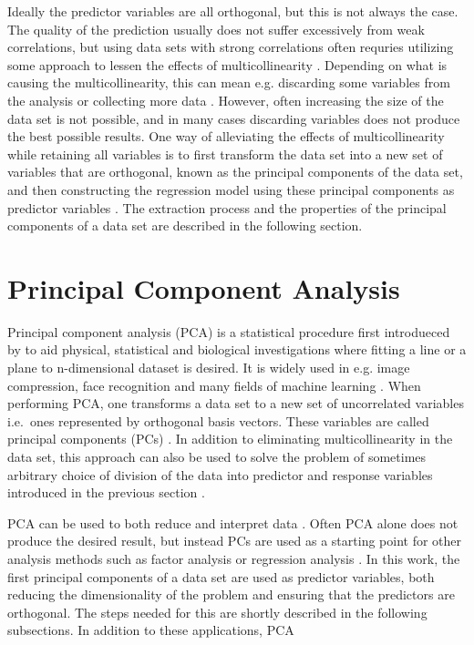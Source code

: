 \documentclass[english, twoside]{HYgradu}
\begin{document}
Ideally the predictor variables are all orthogonal, but this is not always the case. 
The quality of the prediction usually does not suffer excessively from weak correlations, but using data sets with strong correlations often requries utilizing some approach to lessen the effects of multicollinearity \citep{montgomery2012introduction}. Depending on what is causing the multicollinearity, this can mean e.g. discarding some variables from the analysis or collecting more data \citep{montgomery2012introduction}. However, often increasing the size of the data set is not possible, and in many cases discarding variables does not produce the best possible results. One way of alleviating the effects of multicollinearity while retaining all variables is to first transform the data set into a new set of variables that are orthogonal, known as the principal components of the data set, and then constructing the regression model using these principal components as predictor variables \citep{montgomery2012introduction}. The extraction process and the properties of the principal components of a data set are described in the following section.


\section{Principal Component Analysis} \label{sect:pca}
Principal component analysis (PCA) is a statistical procedure first introdueced by \citet{pearson1901lines} to aid physical, statistical and biological investigations where fitting a line or a plane to n-dimensional dataset is desired. It is widely used in e.g. image compression, face recognition and many fields of machine learning \citep{smith2002tutorial, alpaydin2014introduction}. When performing PCA, one transforms a data set to a new set of uncorrelated variables i.e.\ ones represented by orthogonal basis vectors. These variables are called principal components (PCs) \citep{jolliffe2002principal}. In addition to eliminating multicollinearity in the data set, this approach can also be used to solve the problem of sometimes arbitrary choice of division of the data into predictor and response variables introduced in the previous section \citep{pearson1901lines}. 

PCA can be used to both reduce and interpret data \citep{johnson2007applied}. Often PCA alone does not produce the desired result, but instead PCs are used as a starting point for other analysis methods such as factor analysis or regression analysis \citep{johnson2007applied}. In this work, the first principal components of a data set are used as predictor variables, both reducing the dimensionality of the problem and ensuring that the predictors are orthogonal. The steps needed for this are shortly described in the following subsections. In addition to  these applications, PCA 
\end{document}
